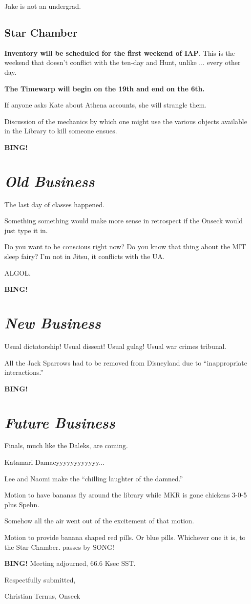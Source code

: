 \documentclass[10pt]{article}
\newcommand{\bing}{{\bf BING!} }
\newcommand{\goto}[1]{\bing \vskip 12pt \section*{{\em{#1}}}}
\newcommand{\ps}{ plus Spehn\xspace}
\begin{document}
Jake is not an undergrad.

\subsection*{Star Chamber}

\textbf{Inventory will be scheduled for the first weekend of IAP}.
This is the weekend that doesn't conflict with the ten-day and Hunt,
unlike ... every other day.

\textbf{The Timewarp will begin on the 19th and end on the 6th.}

If anyone asks Kate about Athena accounts, she will strangle them.

Discussion of the mechanics by which one might use the various objects
available in the Library to kill someone ensues.

\goto{Old Business}

The last day of classes happened.

Something something would make more sense in retrospect if the Onseck
would just type it in.

Do you want to be conscious right now?  Do you know that thing about
the MIT sleep fairy?  I'm not in Jitsu, it conflicts with the UA.

ALGOL.

\goto{New Business}

Usual dictatorship!  Usual dissent!  Usual gulag!  Usual war crimes
tribunal.

All the Jack Sparrows had to be removed from Disneyland due to
``inappropriate interactions.''

\goto{Future Business}

Finals, much like the Daleks, are coming.

Katamari Damacyyyyyyyyyyyy...

Lee and Naomi make the ``chilling laughter of the damned.''

Motion to have bananas fly around the library while MKR is gone chickens 3-0-5\ps.

Somehow all the air went out of the excitement of that motion.

Motion to provide banana shaped red pills.  Or blue pills.  Whichever
one it is, to the Star Chamber.  passes by SONG!

\bing
\noindent
Meeting adjourned, 66.6 Ksec SST.

\vspace{18pt}

\centerline{Respectfully submitted,}
\centerline{Christian Ternus, Onseck}
\end{document}
